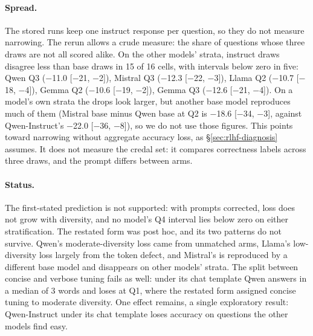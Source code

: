 \paragraph{Spread.} The stored runs keep one instruct response per question, so they do not measure narrowing. The rerun allows a crude measure: the share of questions whose three draws are not all scored alike. On the other models' strata, instruct draws disagree less than base draws in 15 of 16 cells, with intervals below zero in five: Qwen Q3 ($-$11.0 [$-$21, $-$2]), Mistral Q3 ($-$12.3 [$-$22, $-$3]), Llama Q2 ($-$10.7 [$-$18, $-$4]), Gemma Q2 ($-$10.6 [$-$19, $-$2]), Gemma Q3 ($-$12.6 [$-$21, $-$4]). On a model's own strata the drops look larger, but another base model reproduces much of them (Mistral base minus Qwen base at Q2 is $-$18.6 [$-$34, $-$3], against Qwen-Instruct's $-$22.0 [$-$36, $-$8]), so we do not use those figures. This points toward narrowing without aggregate accuracy loss, as \S\ref{sec:rlhf-diagnosis} assumes. It does not measure the credal set: it compares correctness labels across three draws, and the prompt differs between arms.

\paragraph{Status.} The first-stated prediction is not supported: with prompts corrected, loss does not grow with diversity, and no model's Q4 interval lies below zero on either stratification. The restated form was post hoc, and its two patterns do not survive. Qwen's moderate-diversity loss came from unmatched arms, Llama's low-diversity loss largely from the token defect, and Mistral's is reproduced by a different base model and disappears on other models' strata. The split between concise and verbose tuning fails as well: under its chat template Qwen answers in a median of 3 words and loses at Q1, where the restated form assigned concise tuning to moderate diversity. One effect remains, a single exploratory result: Qwen-Instruct under its chat template loses accuracy on questions the other models find easy.
